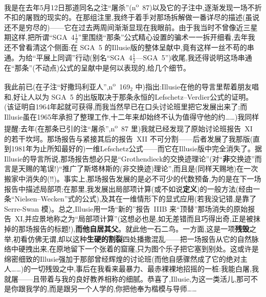 我是在去年5月12日那道同名之注“屠杀”(n\textsuperscript{o}~87)以及它的子注中,逐渐发现一场不折不扣的屠戮的现实的。在那组注里,我终于着手对那场拆解做一番详尽的描述(虽说还不是穷尽的)——它在过去两周间渐渐显现在我眼前。由于我当时不曾像近三星期这样,把所谓“SGA~4$\frac{1}{2}$”里围绕“那条”公式精心设置的骗术一一拆开细看,去年我还不曾看清这个侧面:在 SGA~5 的Illusie版的整体呈献中,竟有这样一丝不苟的串通。为给“平展上同调”行动(别名“SGA~4$\frac{1}{2}$—SGA~5”)收尾,我还得说明这场串通在“那条”(不动点)公式的呈献中是何以表现的,给几个细节。

我此前已(在子注“好撒玛利亚人”,n\textsuperscript{o}~169$_2$ 中)指出:Illusie在他的导言里帮着朋友唱和,好让人以为 SGA~5 的出版取决于那条永恒的Lefschetz--Verdier公式的证明。(该证明自1964年起就可获得,而我当然早已在口头讨论班里把它发展出来了;而Illusie虽在1965年承担了整理工作,十二年来却始终不认为值得守他的约……)\dmark{}我同样提醒:去年(在那条已引的注“屠杀”,n\textsuperscript{o}~87 里)我就已经发现了原始讨论班报告~XI 的若干坎坷。那场报告与紧接其后的报告~XII 不可分割——后者发展了我那版(直到1981年为止所知最好的)一维Lefschetz公式——而它在Illusie版中完全消失了。据Illusie的导言所说,那场报告想必只是“Grothendieck的交换迹理论”(对“\textbf{非}交换迹”而言是天赐的笔误!)“推广了斯塔林斯的(非交换迹)理论”,而且是(同样天赐地)在一次搬家中消失的(!!)。事实上,那场报告发展的是必不可少的代数预备,为的是在下一场报告中描述局部项;在那里,我发展出局部项计算(或不如说\textbf{定义})的一般方法(经由一条“Nielsen--Wecken”式的公式),及其在一维情形下的显式应用(若我没记错,是靠了 Serre-Swan 模)。总之,Illusie用一场“新的”报告~IIIB 来“顶替”那场消失的原始报告~XI,并应景地称之为“局部项计算”(这想必也是,如无差错而且巧得出奇,正是被抹掉的那场报告的标题!),\textbf{而他自居其父}。就此他一石二鸟。一方面,这是一项\textbf{残毁}之举,初看仿佛无谓,却以这种\textbf{生硬的割裂}四处播撒混乱——把一场报告从它的自然脉络中硬拽出来,在原地留下一个张着的窟窿,只为图个乐子把它塞到别处。这或许是绵密细致的Illusie强加于那部曾经辉煌的讨论班(而他自感骤然成了它的绝对主人……)的一切残毁之中,事后在我看来最暴力、最赤裸裸地招摇的一桩:我能白屠,我就屠——且带着与我的良好教养相称的细腻。恭喜了,Illusie,为这一类活儿,那可不是你跟我学的,而是跟另一个人学的,你把他奉为楷模与导师……

